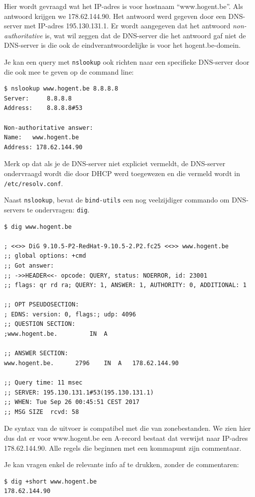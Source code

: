 Hier wordt gevraagd wat het IP-adres is voor hostnaam ``www.hogent.be''. Als antwoord krijgen we 178.62.144.90. Het antwoord werd gegeven door een DNS-server met IP-adres 195.130.131.1. Er wordt aangegeven dat het antwoord \emph{non-authoritative} is, wat wil zeggen dat de DNS-server die het antwoord gaf niet de DNS-server is die ook de eindverantwoordelijke is voor het hogent.be-domein.

Je kan een query met \texttt{nslookup} ook richten naar een specifieke DNS-server door die ook mee te geven op de command line:

\begin{verbatim}
$ nslookup www.hogent.be 8.8.8.8
Server:		8.8.8.8
Address:	8.8.8.8#53

Non-authoritative answer:
Name:	www.hogent.be
Address: 178.62.144.90
\end{verbatim}

Merk op dat als je de DNS-server niet expliciet vermeldt, de DNS-server ondervraagd wordt die door DHCP werd toegewezen en die vermeld wordt in \texttt{/etc/resolv.conf}.

Naast \texttt{nslookup}, bevat de \texttt{bind-utils} een nog veelzijdiger commando om DNS-servers te ondervragen: \texttt{dig}.

\begin{verbatim}
$ dig www.hogent.be

; <<>> DiG 9.10.5-P2-RedHat-9.10.5-2.P2.fc25 <<>> www.hogent.be
;; global options: +cmd
;; Got answer:
;; ->>HEADER<<- opcode: QUERY, status: NOERROR, id: 23001
;; flags: qr rd ra; QUERY: 1, ANSWER: 1, AUTHORITY: 0, ADDITIONAL: 1

;; OPT PSEUDOSECTION:
; EDNS: version: 0, flags:; udp: 4096
;; QUESTION SECTION:
;www.hogent.be.			IN	A

;; ANSWER SECTION:
www.hogent.be.		2796	IN	A	178.62.144.90

;; Query time: 11 msec
;; SERVER: 195.130.131.1#53(195.130.131.1)
;; WHEN: Tue Sep 26 00:45:51 CEST 2017
;; MSG SIZE  rcvd: 58
\end{verbatim}

De syntax van de uitvoer is compatibel met die van zonebestanden. We zien hier dus dat er voor www.hogent.be een A-record bestaat dat verwijst naar IP-adres 178.62.144.90. Alle regels die beginnen met een kommapunt zijn commentaar.

Je kan vragen enkel de relevante info af te drukken, zonder de commentaren:

\begin{verbatim}
$ dig +short www.hogent.be
178.62.144.90
\end{verbatim}

